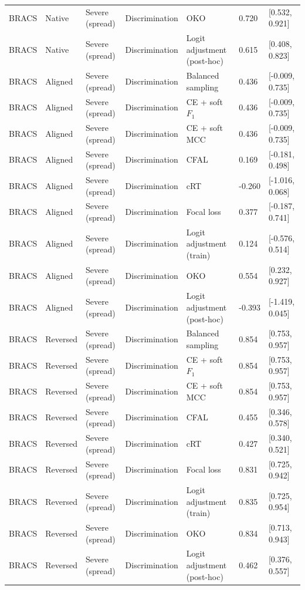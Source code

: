 \begin{longtable}{lllllll}
BRACS & Native & Severe (spread) & Discrimination & OKO & 0.720 & [0.532, 0.921] \\
BRACS & Native & Severe (spread) & Discrimination & Logit adjustment (post-hoc) & 0.615 & [0.408, 0.823] \\
BRACS & Aligned & Severe (spread) & Discrimination & Balanced sampling & 0.436 & [-0.009, 0.735] \\
BRACS & Aligned & Severe (spread) & Discrimination & CE + soft $F_1$ & 0.436 & [-0.009, 0.735] \\
BRACS & Aligned & Severe (spread) & Discrimination & CE + soft MCC & 0.436 & [-0.009, 0.735] \\
BRACS & Aligned & Severe (spread) & Discrimination & CFAL & 0.169 & [-0.181, 0.498] \\
BRACS & Aligned & Severe (spread) & Discrimination & cRT & -0.260 & [-1.016, 0.068] \\
BRACS & Aligned & Severe (spread) & Discrimination & Focal loss & 0.377 & [-0.187, 0.741] \\
BRACS & Aligned & Severe (spread) & Discrimination & Logit adjustment (train) & 0.124 & [-0.576, 0.514] \\
BRACS & Aligned & Severe (spread) & Discrimination & OKO & 0.554 & [0.232, 0.927] \\
BRACS & Aligned & Severe (spread) & Discrimination & Logit adjustment (post-hoc) & -0.393 & [-1.419, 0.045] \\
BRACS & Reversed & Severe (spread) & Discrimination & Balanced sampling & 0.854 & [0.753, 0.957] \\
BRACS & Reversed & Severe (spread) & Discrimination & CE + soft $F_1$ & 0.854 & [0.753, 0.957] \\
BRACS & Reversed & Severe (spread) & Discrimination & CE + soft MCC & 0.854 & [0.753, 0.957] \\
BRACS & Reversed & Severe (spread) & Discrimination & CFAL & 0.455 & [0.346, 0.578] \\
BRACS & Reversed & Severe (spread) & Discrimination & cRT & 0.427 & [0.340, 0.521] \\
BRACS & Reversed & Severe (spread) & Discrimination & Focal loss & 0.831 & [0.725, 0.942] \\
BRACS & Reversed & Severe (spread) & Discrimination & Logit adjustment (train) & 0.835 & [0.725, 0.954] \\
BRACS & Reversed & Severe (spread) & Discrimination & OKO & 0.834 & [0.713, 0.943] \\
BRACS & Reversed & Severe (spread) & Discrimination & Logit adjustment (post-hoc) & 0.462 & [0.376, 0.557] \\

\end{longtable}
